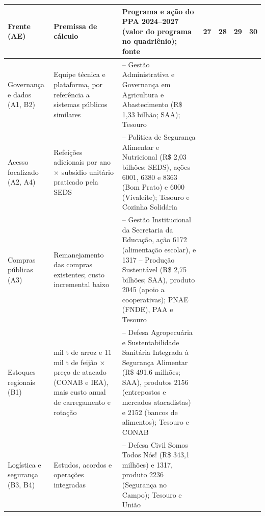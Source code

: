 \documentclass[
	12pt,				%
	openright,			%
	oneside,			%
	a4paper,			%
	chapter=TITLE,		%
	section=TITLE,		%
	english,			%
	french,				%
	spanish,			%
	brazil,				%
 ]{abntex2}
\begin{document}
\begin{quadro}[!htbp]
\centering
\caption{Previsão de recursos e cronograma físico-financeiro 2027--2030}
\label{qua:orcamento-preliminar}
\footnotesize
\renewcommand{\arraystretch}{1.05}
\setlength{\tabcolsep}{2.5pt}
\begin{tabularx}{\textwidth}{|>{\raggedright\arraybackslash}p{2.2cm}|>{\raggedright\arraybackslash}p{3.6cm}|>{\raggedright\arraybackslash}X|c|c|c|c|}
\hline
\textbf{Frente (AE)} & \textbf{Premissa de cálculo} & \textbf{Programa e ação do PPA 2024--2027 (valor do programa no quadriênio); fonte} & \textbf{27} & \textbf{28} & \textbf{29} & \textbf{30} \\
\hline
Governança e dados (A1, B2) & Equipe técnica e plataforma, por referência a sistemas públicos similares & 1318 -- Gestão Administrativa e Governança em Agricultura e Abastecimento (R\$ 1,33 bilhão; SAA); Tesouro & \cellcolor{gray!45} & \cellcolor{gray!45} & \cellcolor{gray!20} & \cellcolor{gray!20} \\
\hline
Acesso focalizado (A2, A4) & Refeições adicionais por ano $\times$ subsídio unitário praticado pela SEDS & 3518 -- Política de Segurança Alimentar e Nutricional (R\$ 2,03 bilhões; SEDS), ações 6001, 6380 e 8363 (Bom Prato) e 6000 (Vivaleite); Tesouro e Cozinha Solidária & \cellcolor{gray!20} & \cellcolor{gray!45} & \cellcolor{gray!45} & \cellcolor{gray!45} \\
\hline
Compras públicas (A3) & Remanejamento das compras existentes; custo incremental baixo & 0815 -- Gestão Institucional da Secretaria da Educação, ação 6172 (alimentação escolar), e 1317 -- Produção Sustentável (R\$ 2,75 bilhões; SAA), produto 2045 (apoio a cooperativas); PNAE (FNDE), PAA e Tesouro & \cellcolor{gray!45} & \cellcolor{gray!45} & \cellcolor{gray!45} & \cellcolor{gray!45} \\
\hline
Estoques regionais (B1) & 29 mil t de arroz e 11 mil t de feijão $\times$ preço de atacado (CONAB e IEA), mais custo anual de carregamento e rotação & 1316 -- Defesa Agropecuária e Sustentabilidade Sanitária Integrada à Segurança Alimentar (R\$ 491,6 milhões; SAA), produtos 2156 (entrepostos e mercados atacadistas) e 2152 (bancos de alimentos); Tesouro e CONAB & & \cellcolor{gray!20} & \cellcolor{gray!45} & \cellcolor{gray!45} \\
\hline
Logística e segurança (B3, B4) & Estudos, acordos e operações integradas & 2811 -- Defesa Civil Somos Todos Nós! (R\$ 343,1 milhões) e 1317, produto 2236 (Segurança no Campo); Tesouro e União & \cellcolor{gray!45} & \cellcolor{gray!45} & \cellcolor{gray!20} & \cellcolor{gray!20} \\

\end{tabularx}
\end{quadro}
\end{document}

